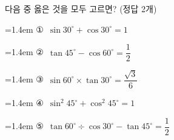 다음 중 옳은 것을 모두 고르면? (정답 2개)
\par\medskip\par\noindent\hangindent=1.4em {\small ①}\ $\sin 30^\circ+\cos 30^\circ=1$\par\noindent\hangindent=1.4em {\small ②}\ $\tan 45^\circ-\cos 60^\circ=\dfrac{1}{2}$\par\noindent\hangindent=1.4em {\small ③}\ $\sin 60^\circ\times\tan 30^\circ=\dfrac{\sqrt{3}}{6}$\par\noindent\hangindent=1.4em {\small ④}\ $\sin^2 45^\circ+\cos^2 45^\circ=1$\par\noindent\hangindent=1.4em {\small ⑤}\ $\tan 60^\circ\div\cos 30^\circ-\tan 45^\circ=\dfrac{1}{2}$\par\medskip
